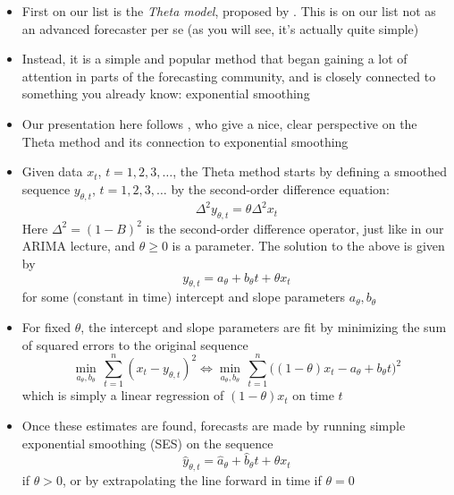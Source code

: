 \documentclass{article}
\begin{document}
\begin{itemize}
\item First on our list is the \emph{Theta model}, proposed by
  \citet{assimakopoulos2000theta}. This is on our list not as an advanced
  forecaster per se (as you will see, it's actually quite simple)

\item Instead, it is a simple and popular method that began gaining a lot of
  attention in parts of the forecasting community, and is closely connected to
  something you already know: exponential smoothing    

\item Our presentation here follows \citet{hyndman2003unmasking}, who give a
  nice, clear perspective on the Theta method and its connection to exponential
  smoothing  

\item Given data $x_t$, $t = 1,2,3,\dots$, the Theta method starts by defining a
  smoothed sequence $y_{\theta,t}$, $t = 1,2,3,\dots$ by the second-order
  difference equation:
  \[
  \Delta^2 y_{\theta,t} = \theta \Delta^2 x_t 
  \]
  Here $\Delta^2 = (1-B)^2$ is the second-order difference operator, just like
  in our ARIMA lecture, and $\theta \geq 0$ is a parameter. The solution to the 
  above is given by  
  \[
  y_{\theta,t} = a_\theta + b_\theta t + \theta x_t
  \]
  for some (constant in time) intercept and slope parameters $a_\theta,
  b_\theta$  

\item For fixed $\theta$, the intercept and slope parameters are fit by
  minimizing the sum of squared errors to the original sequence  
  \[
  \min_{a_\theta, b_\theta} \, \sum_{t=1}^n (x_t - y_{\theta,t})^2 \iff
  \min_{a_\theta, b_\theta} \, \sum_{t=1}^n \Big( (1-\theta) x_t - a_\theta +
  b_\theta t  \Big)^2 
  \]
  which is simply a linear regression of $(1-\theta) x_t$ on time $t$ 

\item Once these estimates  are found,
  forecasts are made by running simple exponential smoothing (SES) on the
  sequence  
  \[
  \hat{y}_{\theta,t} = \hat{a}_\theta + \hat{b}_\theta t + \theta x_t
  \]
  if $\theta > 0$, or by extrapolating the line  forward in time if $\theta = 0$


\end{itemize}
\end{document}
